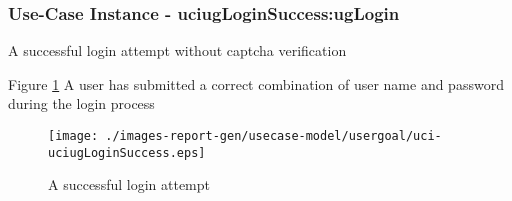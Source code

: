 
	\subsubsection{Use-Case Instance - uciugLoginSuccess:ugLogin}
	
	A successful login attempt without captcha verification		  
	\begin{operationmodel}
	
	\end{operationmodel} 

	
	Figure \ref{fig:lu.uni.lassy.excalibur.examples.icrash-RE-UC-uci-uciugLoginSuccess}
	A user has submitted a correct combination of user name and password during the login process
	
	\begin{figure}[htbp]
	\begin{center}
	
	\texttt{[image: ./images-report-gen/usecase-model/usergoal/uci-uciugLoginSuccess.eps]}
	\end{center}
	\caption[lu.uni.lassy.excalibur.examples.icrash Sequence Diagram: uci-uciugLoginSuccess]{A successful login attempt}
	\label{fig:lu.uni.lassy.excalibur.examples.icrash-RE-UC-uci-uciugLoginSuccess}
	\end{figure}
	\vspace{0.5cm}
